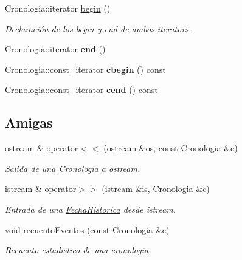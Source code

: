 \begin{DoxyCompactItemize}
Cronologia\+::iterator \hyperlink{classCronologia_abbfd6e21bbb97bc71ad0d8bdfbc158b9}{begin} ()
\begin{DoxyCompactList}\small\item\em Declaración de los begin y end de ambos iterators. \end{DoxyCompactList}\item 
\mbox{\label{classCronologia_aeef830f59857521f98b017b3ac29b098}} 
Cronologia\+::iterator {\bfseries end} ()
\item 
\mbox{\label{classCronologia_aa59635377f076fc2576e5ba164d1d350}} 
Cronologia\+::const\+\_\+iterator {\bfseries cbegin} () const
\item 
\mbox{\label{classCronologia_ab1bc484b6cdc15f923cba94ef3e993ce}} 
Cronologia\+::const\+\_\+iterator {\bfseries cend} () const
\end{DoxyCompactItemize}
\subsection*{Amigas}
\begin{DoxyCompactItemize}
\item 
ostream \& \hyperlink{classCronologia_a5a590e2ec95cc4489c3de5b03e2cac4c}{operator$<$$<$} (ostream \&os, const \hyperlink{classCronologia}{Cronologia} \&c)
\begin{DoxyCompactList}\small\item\em Salida de una \hyperlink{classCronologia}{Cronologia} a ostream. \end{DoxyCompactList}\item 
istream \& \hyperlink{classCronologia_a6fa0f1131309b1cee355b9d8297ea33d}{operator$>$$>$} (istream \&is, \hyperlink{classCronologia}{Cronologia} \&c)
\begin{DoxyCompactList}\small\item\em Entrada de una \hyperlink{classFechaHistorica}{Fecha\+Historica} desde istream. \end{DoxyCompactList}\item 
void \hyperlink{classCronologia_a8ada14624be65bded6fc9c445681d70e}{recuento\+Eventos} (const \hyperlink{classCronologia}{Cronologia} \&c)
\begin{DoxyCompactList}\small\item\em Recuento estadistico de una cronologia. \end{DoxyCompactList}\end{DoxyCompactItemize}


